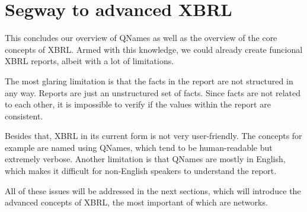 \section{Segway to advanced XBRL}

This concludes our overview of QNames as well as the overview of the core concepts of XBRL.
Armed with this knowledge, we could already create funcional XBRL reports, albeit with a lot of limitations.

The most glaring limitation is that the facts in the report are not structured in any way.
Reports are just an unstructured set of facts.
Since facts are not related to each other, it is impossible to verify if the values within the report are consistent.

Besides that, XBRL in its current form is not very user-friendly.
The concepts for example are named using QNames, which tend to be human-readable but extremely verbose.
Another limitation is that QNames are mostly in English, which makes it difficult for non-English speakers to understand the report.

All of these issues will be addressed in the next sections, which will introduce the advanced concepts of XBRL, 
the most important of which are networks.
